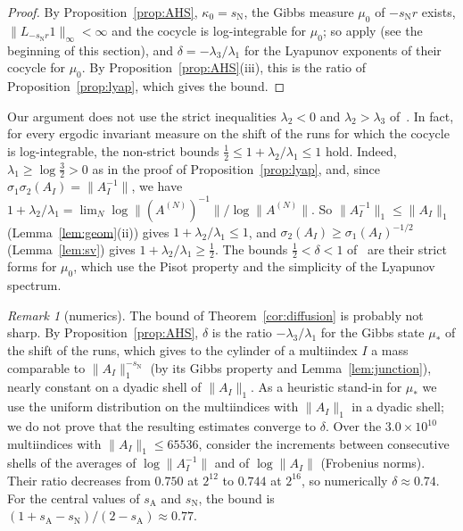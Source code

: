 \documentclass[11pt]{amsart}
\theoremstyle{definition}
\theoremstyle{remark}
\newtheorem{remark}[proposition]{Remark}
\newcommand{\sN}{s_{\mathrm N}}
\newcommand{\sA}{s_{\mathrm A}}
\newcommand{\norm}[1]{\lVert #1\rVert}
\begin{document}
\thmdiffusion*

\begin{proof}
By Proposition~\ref{prop:AHS}, $\kappa_0=\sN$, the Gibbs measure $\mu_0$ of $-\sN r$ exists, $\norm{L_{-\sN r}1}_\infty<\infty$ and the cocycle is log-integrable for $\mu_0$; so \cite[Lemma~26, Thm.~27 and Thm.~30]{AHSinv} apply (see the beginning of this section), and $\delta=-\lambda_3/\lambda_1$ for the Lyapunov exponents of their cocycle for $\mu_0$. By Proposition~\ref{prop:AHS}(iii), this is the ratio of Proposition~\ref{prop:lyap}, which gives the bound.
\end{proof}

Our argument does not use the strict inequalities $\lambda_2<0$ and $\lambda_2>\lambda_3$
of~\cite{AHSinv}. In fact, for every ergodic invariant measure on the shift of the runs for which the cocycle is log-integrable, the non-strict bounds $\frac12\le1+\lambda_2/\lambda_1\le1$ hold. Indeed, $\lambda_1\ge\log\frac32>0$ as in the proof of Proposition~\ref{prop:lyap}, and, since $\sigma_1\sigma_2(A_I)=\norm{A_I^{-1}}$, we have $1+\lambda_2/\lambda_1=\lim_N\log\norm{(A^{(N)})^{-1}}/\log\norm{A^{(N)}}$. So $\norm{A_I^{-1}}_1\le\norm{A_I}_1$ (Lemma~\ref{lem:geom}(ii)) gives $1+\lambda_2/\lambda_1\le1$, and $\sigma_2(A_I)\ge\sigma_1(A_I)^{-1/2}$ (Lemma~\ref{lem:sv}) gives $1+\lambda_2/\lambda_1\ge\frac12$. The bounds $\frac12<\delta<1$ of~\cite{AHSinv} are their strict forms for $\mu_0$, which use the Pisot property and the simplicity of the Lyapunov spectrum.

\begin{remark}[numerics]\label{rem:diffnum}
The bound of Theorem~\ref{cor:diffusion} is probably not sharp. By Proposition~\ref{prop:AHS}, $\delta$ is the ratio $-\lambda_3/\lambda_1$ for the Gibbs state $\mu_*$ of the shift of the runs, which gives to the cylinder of a multiindex $I$ a mass comparable to $\norm{A_I}_1^{-\sN}$ (by its Gibbs property and Lemma~\ref{lem:junction}), nearly constant on a dyadic shell of $\norm{A_I}_1$. As a heuristic stand-in for $\mu_*$ we use the uniform distribution on the multiindices with
$\norm{A_I}_1$ in a dyadic shell; we do not prove that the resulting estimates converge to $\delta$. Over the $3.0\times10^{10}$ multiindices with
$\norm{A_I}_1\le65536$, consider the increments between consecutive shells of the averages
of $\log\norm{A_I^{-1}}$ and of $\log\norm{A_I}$ (Frobenius norms). Their ratio decreases
from $0.750$ at $2^{12}$ to $0.744$ at $2^{16}$, so numerically $\delta\approx0.74$. For
the central values of $\sA$ and $\sN$, the bound is $(1+\sA-\sN)/(2-\sA)\approx0.77$.
\end{remark}
\end{document}
